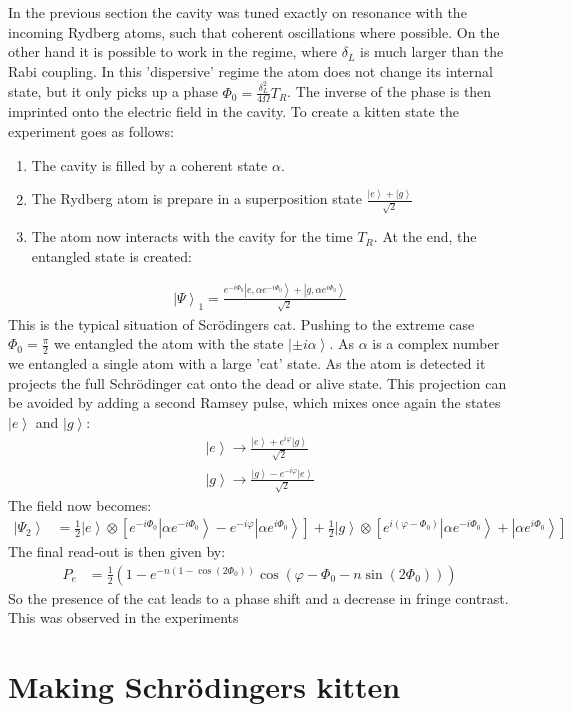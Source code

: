 \documentclass[10pt]{article}
\newcommand{\ket}[1]{\ensuremath{\left|#1\right\rangle}}
\begin{document}
In the previous section the cavity was tuned exactly on resonance with the incoming Rydberg atoms, such that coherent oscillations where possible. On the other hand it is possible to work in the regime, where $\delta_L$ is much larger than the Rabi coupling. In this 'dispersive' regime the atom does not change its internal state, but it only picks up a phase $\Phi_0 =  \frac{\delta_L^2}{4\Omega} T_R$. The inverse of the phase is then imprinted onto the electric field in the cavity. To create a kitten state the experiment goes as follows:
\begin{enumerate}
\item The cavity is filled by a coherent state $\alpha$.
\item The Rydberg atom is prepare in a superposition state $\frac{\ket{e}+\ket{g}}{\sqrt{2}}$
\item The atom now interacts with the cavity for the time $T_R$. At the end, the entangled state is created:
\end{enumerate}
\begin{align}
\ket{\Psi}_1= \frac{e^{-i\Phi_0}\ket{e, \alpha e^{-i\Phi_0}}+\ket{g,\alpha e^{i\Phi_0}}}{\sqrt{2}}
\end{align}
This is the typical situation of Scrödingers cat. Pushing to the extreme case $\Phi_0 = \frac{\pi}{2}$ we entangled the atom with the state $\ket{\pm i\alpha}$. As $\alpha$ is a complex number we entangled a single atom with a large 'cat' state. As the atom is detected it projects the full Schrödinger cat onto the dead or alive state. This projection can be avoided by adding a second Ramsey pulse, which mixes once again the states $\ket{e}$ and $\ket{g}$:
\begin{align}
\ket{e}\rightarrow\frac{\ket{e}+e^{i\varphi}\ket{g}}{\sqrt{2}}\\
\ket{g}\rightarrow\frac{\ket{g}-e^{-i\varphi}\ket{e}}{\sqrt{2}}
\end{align}
The field now becomes:
\begin{align}
\ket{\Psi_2} &= \frac{1}{2}\ket{e}\otimes\left[e^{-i\Phi_0}\ket{\alpha e^{-i\Phi_0}}-e^{-i\varphi}\ket{\alpha e^{i\Phi_0}}\right]+\frac{1}{2}\ket{g}\otimes\left[e^{i(\varphi-\Phi_0)}\ket{\alpha e^{-i\Phi_0}}+\ket{\alpha e^{i\Phi_0}}\right]
\end{align}
The final read-out is then given by:
\begin{align}
P_e &= \frac{1}{2}\left(1- e^{-n(1-\cos(2\Phi_0))}\cos(\varphi-\Phi_0-n\sin(2\Phi_0))\right)
\end{align}
So the presence of the cat leads to a phase shift and a decrease in fringe contrast. This was observed in the experiments \section{Making Schrödingers kitten}
\end{document}
